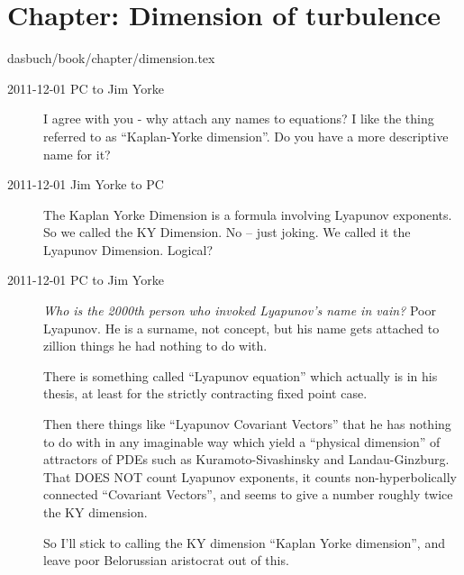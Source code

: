 \section{Chapter: Dimension of turbulence}
\label{c-dimension}\noindent dasbuch/book/chapter/dimension.tex
\begin{description}

\item[2011-12-01 PC to Jim Yorke]
I agree with you - why attach any names to equations?  I like the thing
referred to as ``Kaplan-Yorke dimension''. Do you have a more descriptive
name for it?

\item[2011-12-01 Jim Yorke to PC] The Kaplan Yorke Dimension is a formula
involving Lyapunov exponents. So we called the KY Dimension. No -- just
joking. We called it the Lyapunov Dimension. Logical?

\item[2011-12-01 PC to Jim Yorke] \emph{Who is the 2000th person who
invoked Lyapunov's name in vain?} Poor Lyapunov. He is a surname, not
concept, but his name gets attached to zillion things he had nothing to
do with.

There is something called ``Lyapunov equation'' which actually is in his
thesis, at least for the strictly contracting fixed point case.

Then there things like ``Lyapunov Covariant Vectors'' that he has nothing
to do with in any imaginable way which yield a ``physical dimension'' of
attractors of PDEs such as Kuramoto-Sivashinsky and Landau-Ginzburg. That
DOES NOT count Lyapunov exponents, it counts non-hyperbolically connected
``Covariant Vectors'', and seems to give a number roughly twice the KY
dimension.

So I'll stick to calling the KY dimension  ``Kaplan Yorke dimension'', and
leave poor Belorussian aristocrat out of this.

\end{description}

